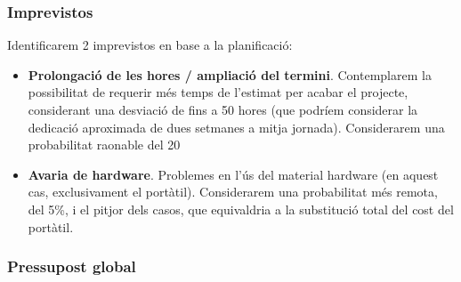 \subsubsection{Imprevistos}

Identificarem 2 imprevistos en base a la planificació:

\begin{itemize}
\item \textbf{Prolongació de les hores / ampliació del termini}. Contemplarem la possibilitat de requerir més temps de l’estimat per acabar el projecte, considerant una desviació de fins a 50 hores (que podríem considerar la dedicació aproximada de dues setmanes a mitja jornada). Considerarem una probabilitat raonable del 20%
\item \textbf{Avaria de hardware}. Problemes en l’ús del material hardware (en aquest cas, exclusivament el portàtil). Considerarem una probabilitat més remota, del 5\%, i el pitjor dels casos, que equivaldria a la substitució total del cost del portàtil.
\end{itemize}

\begin{table}[htb]
\centering
\label{PressupostImprevistos}
\caption{Imprevistos}
\end{table}

\subsubsection{Pressupost global}

